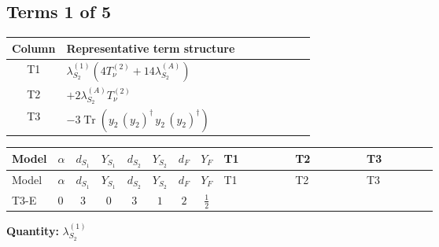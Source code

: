 \documentclass[8pt]{article}
\begin{document}
\begin{landscape}
\subsection*{Terms 1 of 5}
\begin{center}
\begin{tabular}{@{}c >{\raggedright\arraybackslash}p{0.82\linewidth}@{}}
\toprule
Column & Representative term structure \\
\midrule
T1 & \(\displaystyle {\lambda_{S_2}^{(1)}} (4 T_{\nu}^{(2)}+14 {\lambda_{S_2}^{(A)}})\) \\
\midrule
T2 & \(\displaystyle +2 {\lambda_{S_2}^{(A)}} T_{\nu}^{(2)}\) \\
\midrule
T3 & \(\displaystyle -3 \operatorname{Tr}\!\left({y_2}\,\left({y_2}\right)^{\dagger}\,{y_2}\,\left({y_2}\right)^{\dagger}\right)\) \\
\midrule
\bottomrule
\end{tabular}
\end{center}
\smallskip
\tiny
\begin{longtable}{@{}llcccccc >{\raggedright\arraybackslash}p{0.21\linewidth} >{\raggedright\arraybackslash}p{0.21\linewidth} >{\raggedright\arraybackslash}p{0.21\linewidth}@{}}
\toprule
Model & $\alpha$ & $d_{S_1}$ & $Y_{S_1}$ & $d_{S_2}$ & $Y_{S_2}$ & $d_F$ & $Y_F$ & T1 & T2 & T3 \\
\midrule
\endfirsthead
\toprule
Model & $\alpha$ & $d_{S_1}$ & $Y_{S_1}$ & $d_{S_2}$ & $Y_{S_2}$ & $d_F$ & $Y_F$ & T1 & T2 & T3 \\
\midrule
\endhead
T3-E & $0$ & $3$ & $0$ & $3$ & $1$ & $2$ & $\frac{1}{2}$ & \scriptsize\adjustbox{max width=\linewidth}{$\begin{gathered} {\lambda_{S_2}^{(1)}} (4 T_{\nu}^{(2)}+14 {\lambda_{S_2}^{(A)}})\end{gathered}$} & \scriptsize\adjustbox{max width=\linewidth}{$\begin{gathered} +2 {\lambda_{S_2}^{(A)}} T_{\nu}^{(2)}\end{gathered}$} & \scriptsize\adjustbox{max width=\linewidth}{$\begin{gathered} -3 \operatorname{Tr}\!\left({y_2}\,\left({y_2}\right)^{\dagger}\,{y_2}\,\left({y_2}\right)^{\dagger}\right)\end{gathered}$} \\
\midrule
\bottomrule
\end{longtable}
\clearpage
\noindent\textbf{Quantity: }$\lambda_{S_2}^{(1)}$\par\smallskip

\end{landscape}
\end{document}
